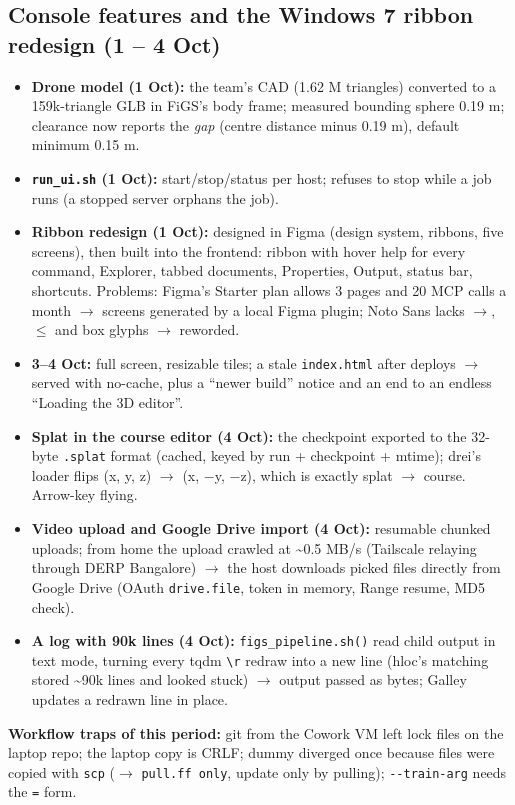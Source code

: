 \documentclass[11pt,a4paper]{article}
\newcommand{\code}[1]{\texttt{#1}}
\begin{document}
\subsection{Console features and the Windows 7 ribbon redesign (1 – 4 Oct)}
\begin{itemize}
  \item \textbf{Drone model (1 Oct):} the team's CAD (1.62 M triangles) converted to a 159k-triangle GLB in FiGS's body frame; measured bounding sphere 0.19 m; clearance now reports the \emph{gap} (centre distance minus 0.19 m), default minimum 0.15 m.
  \item \textbf{\code{run\_\allowbreak{}ui.sh} (1 Oct):} start/stop/status per host; refuses to stop while a job runs (a stopped server orphans the job).
  \item \textbf{Ribbon redesign (1 Oct):} designed in Figma (design system, ribbons, five screens), then built into the frontend: ribbon with hover help for every command, Explorer, tabbed documents, Properties, Output, status bar, shortcuts. Problems: Figma's Starter plan allows 3 pages and 20 MCP calls a month $\rightarrow$ screens generated by a local Figma plugin; Noto Sans lacks $\rightarrow$, $\le$ and box glyphs $\rightarrow$ reworded.
  \item \textbf{3–4 Oct:} full screen, resizable tiles; a stale \code{index.html} after deploys $\rightarrow$ served with no-cache, plus a ``newer build'' notice and an end to an endless ``Loading the 3D editor''.
  \item \textbf{Splat in the course editor (4 Oct):} the checkpoint exported to the 32-byte \code{.splat} format (cached, keyed by run + checkpoint + mtime); drei's loader flips (x, y, z) $\rightarrow$ (x, $-$y, $-$z), which is exactly splat $\rightarrow$ course. Arrow-key flying.
  \item \textbf{Video upload and Google Drive import (4 Oct):} resumable chunked uploads; from home the upload crawled at \textasciitilde{}0.5 MB/s (Tailscale relaying through DERP Bangalore) $\rightarrow$ the host downloads picked files directly from Google Drive (OAuth \code{drive.file}, token in memory, Range resume, MD5 check).
  \item \textbf{A log with 90k lines (4 Oct):} \code{figs\_\allowbreak{}pipeline.sh()} read child output in text mode, turning every tqdm \code{\textbackslash{}r} redraw into a new line (hloc's matching stored \textasciitilde{}90k lines and looked stuck) $\rightarrow$ output passed as bytes; Galley updates a redrawn line in place.
\end{itemize}
\textbf{Workflow traps of this period:} git from the Cowork VM left lock files on the laptop repo; the laptop copy is CRLF; dummy diverged once because files were copied with \code{scp} ($\rightarrow$ \code{pull.ff only}, update only by pulling); \code{-{}-train-arg} needs the \code{=} form.
\end{document}
